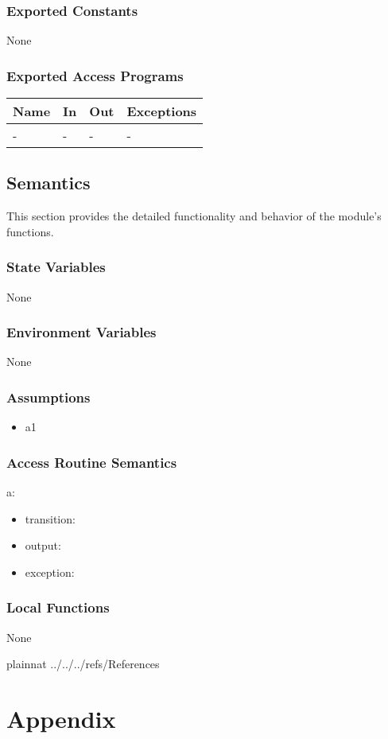 \documentclass[12pt, titlepage]{article}
\begin{document}
\subsubsection{Exported Constants}

None

\subsubsection{Exported Access Programs}

\begin{center}
\begin{tabular}{p{2cm} p{4cm} p{4cm} p{2cm}}
\hline
\textbf{Name} & \textbf{In} & \textbf{Out} & \textbf{Exceptions} \\
\hline
- & - & - & - \\
\hline
\end{tabular}
\end{center}

\subsection{Semantics}

This section provides the detailed functionality and behavior of the module’s
functions.

\subsubsection{State Variables}

None

\subsubsection{Environment Variables}

None

\subsubsection{Assumptions}

\begin{itemize}
\item a1
\end{itemize}

\subsubsection{Access Routine Semantics}

\noindent a:
\begin{itemize}
\item transition: 
\item output: 
\item exception: 
\end{itemize}

\subsubsection{Local Functions}

None

\newpage

 {plainnat}
 {../../../refs/References}

\newpage

\section{Appendix} \label{Appendix}

\end{document}
